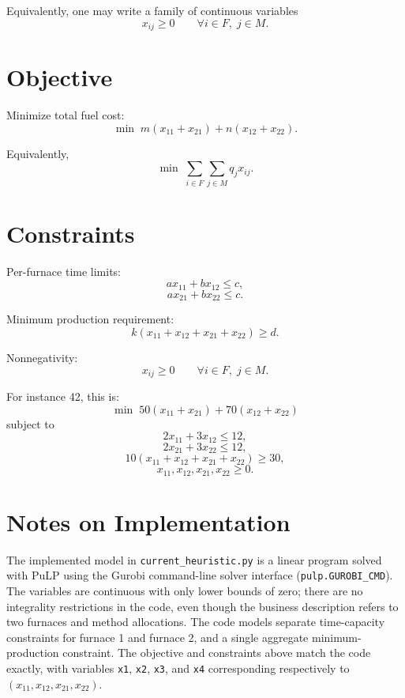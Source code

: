 Equivalently, one may write a family of continuous variables
\[
x_{ij} \ge 0 \qquad \forall i \in F,\; j \in M.
\]

\section*{Objective}

Minimize total fuel cost:
\[
\min \; m(x_{11}+x_{21}) + n(x_{12}+x_{22}).
\]

Equivalently,
\[
\min \; \sum_{i\in F}\sum_{j\in M} q_j x_{ij}.
\]

\section*{Constraints}

Per-furnace time limits:
\[
a x_{11} + b x_{12} \le c,
\]
\[
a x_{21} + b x_{22} \le c.
\]

Minimum production requirement:
\[
k(x_{11}+x_{12}+x_{21}+x_{22}) \ge d.
\]

Nonnegativity:
\[
x_{ij} \ge 0 \qquad \forall i \in F,\; j \in M.
\]

For instance 42, this is:
\[
\min \; 50(x_{11}+x_{21}) + 70(x_{12}+x_{22})
\]
subject to
\[
2x_{11} + 3x_{12} \le 12,
\]
\[
2x_{21} + 3x_{22} \le 12,
\]
\[
10(x_{11}+x_{12}+x_{21}+x_{22}) \ge 30,
\]
\[
x_{11},x_{12},x_{21},x_{22} \ge 0.
\]

\section*{Notes on Implementation}

The implemented model in \texttt{current\_heuristic.py} is a linear program solved with PuLP using the Gurobi command-line solver interface (\texttt{pulp.GUROBI\_CMD}). The variables are continuous with only lower bounds of zero; there are no integrality restrictions in the code, even though the business description refers to two furnaces and method allocations. The code models separate time-capacity constraints for furnace 1 and furnace 2, and a single aggregate minimum-production constraint. The objective and constraints above match the code exactly, with variables \texttt{x1}, \texttt{x2}, \texttt{x3}, and \texttt{x4} corresponding respectively to $(x_{11},x_{12},x_{21},x_{22})$.

